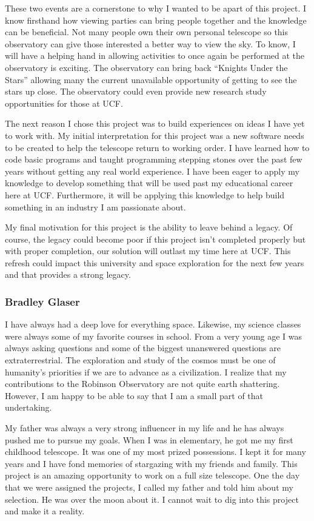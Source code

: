 \documentclass[12pt]{report}
\begin{document}
These two events are a cornerstone to why I wanted to be apart of this project. I know firsthand how viewing parties can bring people together and the knowledge can be beneficial. Not many people own their own personal telescope so this observatory can give those interested a better way to view the sky. To know, I will have a helping hand in allowing activities to once again be performed at the observatory is exciting. The observatory can bring back “Knights Under the Stars” allowing many the current unavailable opportunity of getting to see the stars up close. The observatory could even provide new research study opportunities for those at UCF.

The next reason I chose this project was to build experiences on ideas I have yet to work with. My initial interpretation for this project was a new software needs to be created to help the telescope return to working order. I have learned how to code basic programs and taught programming stepping stones over the past few years without getting any real world experience. I have been eager to apply my knowledge to develop something that will be used past my educational career here at UCF. Furthermore, it will be applying this knowledge to help build something in an industry I am passionate about.

My final motivation for this project is the ability to leave behind a legacy. Of course, the legacy could become poor if this project isn’t completed properly but with proper completion, our solution will outlast my time here at UCF. This refresh could impact this university and space exploration for the next few years and that provides a strong legacy.

\subsubsection*{Bradley Glaser}

I have always had a deep love for everything space. Likewise, my science classes were always some of my favorite courses in school. From a very young age I was always asking questions and some of the biggest unanswered questions are extraterrestrial. The exploration and study of the cosmos must be one of humanity’s priorities if we are to advance as a civilization. I realize that my contributions to the Robinson Observatory are not quite earth shattering. However, I am happy to be able to say that I am a small part of that undertaking.

My father was always a very strong influencer in my life and he has always pushed me to pursue my goals. When I was in elementary, he got me my first childhood telescope. It was one of my most prized possessions. I kept it for many years and I have fond memories of stargazing with my friends and family. This project is an amazing opportunity to work on a full size telescope. One the day that we were assigned the projects, I called my father and told him about my selection. He was over the moon about it. I cannot wait to dig into this project and make it a reality.
\end{document}
